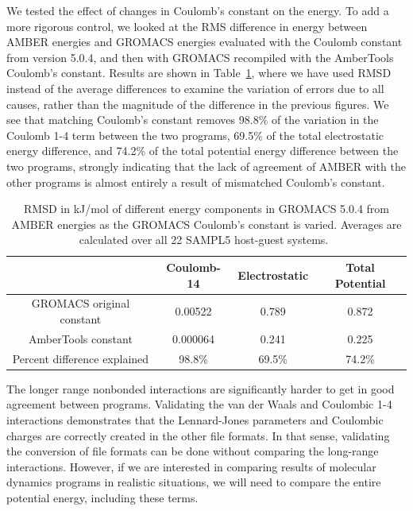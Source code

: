 We tested the effect of changes in Coulomb's constant on the energy.
To add a more rigorous control, we looked at the RMS difference in
energy between AMBER energies and GROMACS energies evaluated with the
Coulomb constant from version 5.0.4, and then with GROMACS recompiled with the
AmberTools Coulomb's constant.  Results are shown in
Table~\ref{table:coulchange}, where we have used RMSD instead of the
average differences to examine the variation of errors due to all causes,
rather than the magnitude of the difference in the previous figures.
 We see that matching Coulomb's constant
removes 98.8\% of the variation in the Coulomb 1-4 term between the
two programs, 69.5\% of the total electrostatic energy difference, and
74.2\% of the total potential energy difference between the two
programs, strongly indicating that the lack of agreement of AMBER with
the other programs is almost entirely a result of mismatched Coulomb's constant.

\begin{table}
\caption{RMSD in kJ/mol of different energy components in GROMACS
  5.0.4 from AMBER energies as the GROMACS Coulomb's constant is
  varied. Averages are calculated over all 22 SAMPL5 host-guest
  systems.~\label{table:coulchange}}
\begin{center}
\begin{tabular}{|c|ccc|}
\hline
                          & Coulomb-14  & Electrostatic & Total Potential \\
\hline
GROMACS original constant &  0.00522    & 0.789         & 0.872  \\ 
AmberTools constant      &  0.000064   & 0.241         & 0.225 \\
Percent difference explained & 98.8\%   & 69.5\%        & 74.2\% \\  
\hline
\end{tabular}
\end{center}
\end{table}

The longer range nonbonded interactions are significantly harder to
get in good agreement between programs.  Validating the van der Waals
and Coulombic 1-4 interactions demonstrates that the Lennard-Jones
parameters and Coulombic charges are correctly created in the other
file formats.  In that sense, validating the conversion of file
formats can be done without comparing the long-range
interactions. However, if we are interested in comparing results of
molecular dynamics programs in realistic situations, we will need to
compare the entire potential energy, including these terms. 

